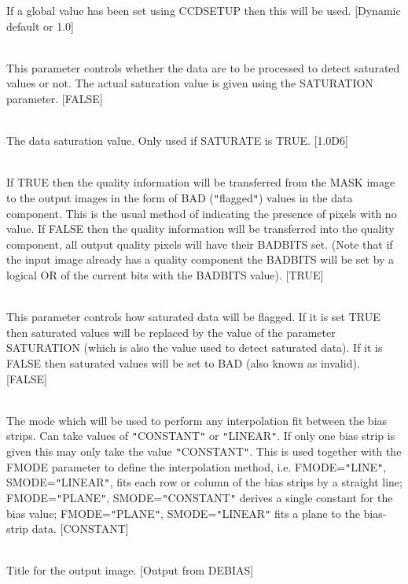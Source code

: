 \documentclass[twoside,11pt]{article}
\newcommand{\htmlref}[2]{#1}
\renewcommand{\_}{\texttt{\symbol{95}}}
\newcommand{\qt}[1]{{\tt "}#1{\tt "}}
\newcommand{\xroutine}[1]{\htmlref{{\sc #1}}{#1}}
\newcommand{\sstsubsection}[1]{ \item[{#1}] \mbox{} \\}
\newcommand{\sstsubsection}[1]{\item[{#1}]}
\begin{document}
{{{         If a global value has been set using \xroutine{CCDSETUP} then this will
         be used.
         [Dynamic default or 1.0]
      }
      \sstsubsection{
         SATURATE = \_LOGICAL (Read)
      } {
         This parameter controls whether the data are to be processed to
         detect saturated values or not. The actual saturation value is
         given using the SATURATION parameter.
         [FALSE]
      }
      \sstsubsection{
         SATURATION = \_DOUBLE (Read)
      } {
         The data saturation value. Only used if SATURATE is TRUE.
         [1.0D6]
      }
      \sstsubsection{
         SETBAD = \_LOGICAL (Read)
      } {
         If TRUE then the quality information will be transferred
         from the MASK image to the output images in the form of BAD
         (\qt{flagged}) values in the data component. This is the usual
         method of indicating the presence of pixels with no value. If
         FALSE then the quality information will be transferred into
         the quality component, all output quality pixels will have
         their BADBITS set. (Note that if the input image already has a
         quality component the BADBITS will be set by a logical OR of
         the current bits with the BADBITS value).
         [TRUE]
      }
      \sstsubsection{
         SETSAT = \_LOGICAL (Read)
      } {
         This parameter controls how saturated data will be flagged.
         If it is set TRUE then saturated values will be replaced by
         the value of the parameter SATURATION (which is also the value
         used to detect saturated data). If it is FALSE then saturated
         values will be set to BAD (also known as invalid).
         [FALSE]
      }
      \sstsubsection{
         SMODE = LITERAL (Read)
      } {
         The mode which will be used to perform any interpolation fit
         between the bias strips. Can take values of \qt{CONSTANT} or
         \qt{LINEAR}. If only one bias strip is given this may only take
         the value \qt{CONSTANT}. This is used together with the FMODE
         parameter to define the interpolation method, i.e.
         FMODE=\qt{LINE}, SMODE=\qt{LINEAR}, fits each row or column of the
         bias strips by a straight line; FMODE=\qt{PLANE},
         SMODE=\qt{CONSTANT} derives a single constant for the bias value;
         FMODE=\qt{PLANE}, SMODE=\qt{LINEAR} fits a plane to the bias-strip
         data.
         [CONSTANT]
      }
      \sstsubsection{
         TITLE = LITERAL (Read)
      } {
         Title for the output image.
         [Output from DEBIAS]
      }
      \sstsubsection{
}}}
\end{document}
